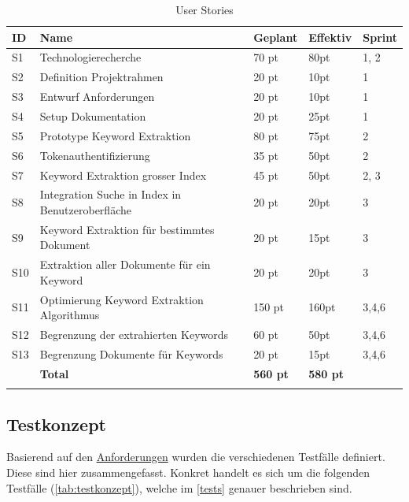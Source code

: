 \begin{longtable}{|p{0.6cm}|P{4.5cm}|p{1.4cm}|p{1.4cm}|p{2.4cm}|}
\hline
ID  & Name & Geplant & Effektiv &Sprint\\ \hline
S1 & Technologierecherche           & 70 pt             &  80pt              & 1, 2 \\ \hline
S2 & Definition Projektrahmen           & 20 pt             &  10pt              & 1  \\ \hline
S3 & Entwurf Anforderungen           & 20 pt             &  10pt              & 1 \\ \hline
S4 & Setup Dokumentation           & 20 pt             &  25pt              & 1 \\ \hline
S5 & Prototype Keyword Extraktion            & 80 pt             &  75pt              & 2 \\ \hline
S6 & Tokenauthentifizierung           & 35 pt             &  50pt              & 2 \\ \hline
S7 & Keyword Extraktion grosser Index          & 45 pt             &  50pt              & 2, 3 \\ \hline
S8 & Integration Suche in Index in Benutzeroberfläche           & 20 pt             &  20pt             & 3 \\ \hline
S9 & Keyword Extraktion für bestimmtes Dokument         & 20 pt             &  15pt              & 3 \\ \hline
S10 & Extraktion aller Dokumente für ein Keyword       & 20 pt             &  20pt              & 3 \\ \hline
S11 & Optimierung Keyword Extraktion Algorithmus    & 150 pt             &  160pt              & 3,4,6 \\ \hline
S12 & Begrenzung der extrahierten Keywords    & 60 pt             &  50pt              & 3,4,6 \\ \hline
S13 & Begrenzung Dokumente für Keywords    & 20 pt             &  15pt              & 3,4,6 \\ \hline
\hline
 & \textbf{Total}                       & \textbf{560 pt}& \textbf{580 pt}&   \\\hline
    \caption{User Stories}
 \label{user-stories}
\end{longtable}

\subsection{Testkonzept}
Basierend auf den \hyperref[anforderungen]{Anforderungen} wurden die verschiedenen Testfälle definiert. Diese sind hier zusammengefasst. Konkret handelt es sich um die folgenden Testfälle (\autoref{tab:testkonzept}), welche im \autoref{tests} genauer beschrieben sind.

